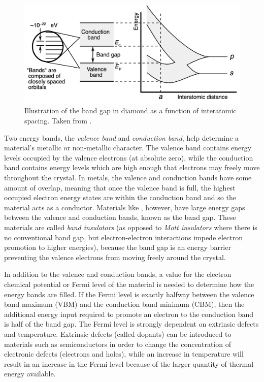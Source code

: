 \begin{figure}[ht]
\centering
\includegraphics[width=\linewidth]{images/band_gap.png}
\caption[Illustration of the band gap in diamond as a function of interatomic spacing.]{Illustration of the band gap in diamond as a function of interatomic spacing. Taken from \cite{Chetvorno2017}.}
\label{figure:band_gap}
\end{figure}

Two energy bands, the \emph{valence band} and \emph{conduction band}, help determine a material's metallic or non-metallic character. The valence band contains energy levels occupied by the valence electrons (at absolute zero), while the conduction band contains energy levels which are high enough that electrons may freely move throughout the crystal. In metals, the valence and conduction bands have some amount of overlap, meaning that once the valence band is full, the highest occupied electron energy states are within the conduction band and so the material acts as a conductor. Materials like \zirconia , however, have large energy gaps between the valence and conduction bands, known as the band gap. These materials are called \emph{band insulators} (as opposed to \emph{Mott insulators} where there is no conventional band gap, but electron-electron interactions impede electron promotion to higher energies), because the band gap is an energy barrier preventing the valence electrons from moving freely around the crystal. 

In addition to the valence and conduction bands, a value for the electron chemical potential or Fermi level of the material is needed to determine how the energy bands are filled. If the Fermi level is exactly halfway between the valence band maximum (VBM) and the conduction band minimum (CBM), then the additional energy input required to promote an electron to the conduction band is half of the band gap. The Fermi level is strongly dependent on extrinsic defects and temperature. Extrinsic defects (called dopants) can be introduced to materials such as semiconductors in order to change the concentration of electronic defects (electrons and holes), while an increase in temperature will result in an increase in the Fermi level because of the larger quantity of thermal energy available.

